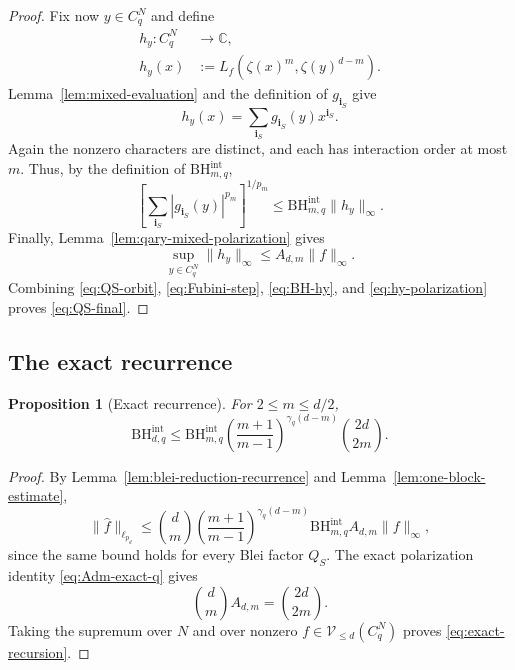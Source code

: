 \documentclass[11pt,a4paper]{article}
\numberwithin{equation}{section}
\theoremstyle{cleanplain}
\newtheorem{proposition}[proposition]{Proposition}
\theoremstyle{cleandefinition}
\theoremstyle{cleanremark}
\newcommand{\C}{\mathbb C}
\newcommand{\BHint}[2]{\mathrm{BH}^{\mathrm{int}}_{#1,#2}}
\begin{document}
\begin{proof}
Fix now $y\in C_q^N$ and define
\begin{equation}\label{eq:hy}
 \begin{aligned}
 h_y:C_q^N&\longrightarrow\C,\\
 h_y(x)&:=L_f(\zeta(x)^m,\zeta(y)^{d-m}).
 \end{aligned}
\end{equation}
Lemma~\ref{lem:mixed-evaluation} and the definition of
$g_{\mathbf i_S}$ give
\[
 h_y(x)=\sum_{\mathbf i_S}g_{\mathbf i_S}(y)x^{\mathbf i_S}.
\]
Again the nonzero characters are distinct, and each has interaction order at
most $m$.  Thus, by the definition of $\BHint{m}{q}$,
\begin{equation}\label{eq:BH-hy}
 \left[
 \sum_{\mathbf i_S}|g_{\mathbf i_S}(y)|^{p_m}
 \right]^{1/p_m}
 \leq\BHint{m}{q}\|h_y\|_\infty.
\end{equation}
Finally, Lemma~\ref{lem:qary-mixed-polarization} gives
\begin{equation}\label{eq:hy-polarization}
 \sup_{y\in C_q^N}\|h_y\|_\infty
 \leq A_{d,m}\|f\|_\infty.
\end{equation}
Combining \eqref{eq:QS-orbit}, \eqref{eq:Fubini-step},
\eqref{eq:BH-hy}, and \eqref{eq:hy-polarization} proves
\eqref{eq:QS-final}.
\end{proof}

\subsection{The exact recurrence}

\begin{proposition}[Exact recurrence]\label{prop:exact-recursion}
For $2\leq m\leq d/2$,
\begin{equation}\label{eq:exact-recursion}
 \BHint{d}{q}\leq
 \BHint{m}{q}
 \left(\frac{m+1}{m-1}\right)^{\gamma_q(d-m)}
 \binom{2d}{2m}.
\end{equation}
\end{proposition}

\begin{proof}
By Lemma~\ref{lem:blei-reduction-recurrence} and
Lemma~\ref{lem:one-block-estimate},
\[
 \|\widehat f\|_{\ell_{p_d}}
 \leq
 \binom dm
 \left(\frac{m+1}{m-1}\right)^{\gamma_q(d-m)}
 \BHint{m}{q}A_{d,m}\|f\|_\infty,
\]
since the same bound holds for every Blei factor $Q_S$.  The exact
polarization identity \eqref{eq:Adm-exact-q} gives
\[
 \binom dm A_{d,m}=\binom{2d}{2m}.
\]
Taking the supremum over $N$ and over nonzero
$f\in\mathcal V_{\leq d}(C_q^N)$ proves \eqref{eq:exact-recursion}.
\end{proof}
\end{document}
